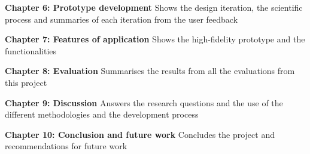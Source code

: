 \textbf{Chapter 6: Prototype development} Shows the design iteration, the scientific process and summaries of each iteration from the user feedback

\textbf{Chapter 7: Features of application} Shows the high-fidelity prototype and the functionalities

\textbf{Chapter 8: Evaluation} Summarises the results from all the evaluations from this project

\textbf{Chapter 9: Discussion} Answers the research questions and the use of the different methodologies and the development process

\textbf{Chapter 10: Conclusion and future work} Concludes the project and recommendations for future work




